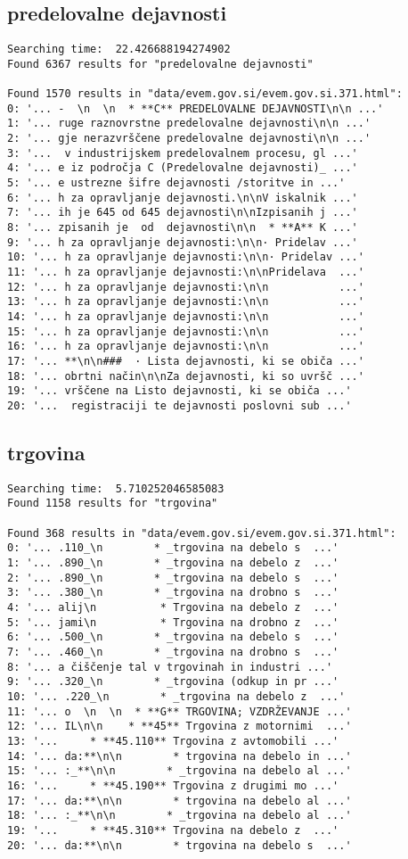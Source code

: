 \documentclass[runningheads]{llncs}
\begin{document}
\subsection{predelovalne dejavnosti}
\begin{lstlisting}
Searching time:  22.426688194274902
Found 6367 results for "predelovalne dejavnosti"

Found 1570 results in "data/evem.gov.si/evem.gov.si.371.html":
0: '... -  \n  \n  * **C** PREDELOVALNE DEJAVNOSTI\n\n ...'
1: '... ruge raznovrstne predelovalne dejavnosti\n\n ...'
2: '... gje nerazvrščene predelovalne dejavnosti\n\n ...'
3: '...  v industrijskem predelovalnem procesu, gl ...'
4: '... e iz področja C (Predelovalne dejavnosti)_ ...'
5: '... e ustrezne šifre dejavnosti /storitve in ...'
6: '... h za opravljanje dejavnosti.\n\nV iskalnik ...'
7: '... ih je 645 od 645 dejavnosti\n\nIzpisanih j ...'
8: '... zpisanih je  od  dejavnosti\n\n  * **A** K ...'
9: '... h za opravljanje dejavnosti:\n\n· Pridelav ...'
10: '... h za opravljanje dejavnosti:\n\n· Pridelav ...'
11: '... h za opravljanje dejavnosti:\n\nPridelava  ...'
12: '... h za opravljanje dejavnosti:\n\n           ...'
13: '... h za opravljanje dejavnosti:\n\n           ...'
14: '... h za opravljanje dejavnosti:\n\n           ...'
15: '... h za opravljanje dejavnosti:\n\n           ...'
16: '... h za opravljanje dejavnosti:\n\n           ...'
17: '... **\n\n###  · Lista dejavnosti, ki se običa ...'
18: '... obrtni način\n\nZa dejavnosti, ki so uvršč ...'
19: '... vrščene na Listo dejavnosti, ki se običa ...'
20: '...  registraciji te dejavnosti poslovni sub ...'
\end{lstlisting}

\subsection{trgovina}
\begin{lstlisting}
Searching time:  5.710252046585083
Found 1158 results for "trgovina"

Found 368 results in "data/evem.gov.si/evem.gov.si.371.html":
0: '... .110_\n        * _trgovina na debelo s  ...'
1: '... .890_\n        * _trgovina na debelo z  ...'
2: '... .890_\n        * _trgovina na debelo s  ...'
3: '... .380_\n        * _trgovina na drobno s  ...'
4: '... alij\n          * Trgovina na debelo z  ...'
5: '... jami\n          * Trgovina na drobno z  ...'
6: '... .500_\n        * _trgovina na debelo s  ...'
7: '... .460_\n        * _trgovina na drobno s  ...'
8: '... a čiščenje tal v trgovinah in industri ...'
9: '... .320_\n        * _trgovina (odkup in pr ...'
10: '... .220_\n        * _trgovina na debelo z  ...'
11: '... o  \n  \n  * **G** TRGOVINA; VZDRŽEVANJE ...'
12: '... IL\n\n    * **45** Trgovina z motornimi  ...'
13: '...     * **45.110** Trgovina z avtomobili ...'
14: '... da:**\n\n        * trgovina na debelo in ...'
15: '... :_**\n\n        * _trgovina na debelo al ...'
16: '...     * **45.190** Trgovina z drugimi mo ...'
17: '... da:**\n\n        * trgovina na debelo al ...'
18: '... :_**\n\n        * _trgovina na debelo al ...'
19: '...     * **45.310** Trgovina na debelo z  ...'
20: '... da:**\n\n        * trgovina na debelo s  ...'
\end{lstlisting}
\end{document}
